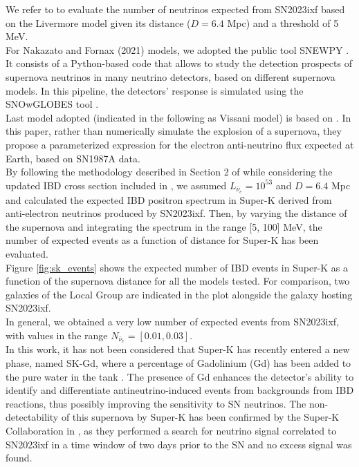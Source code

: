 \documentclass[twocolumn]{aastex631}
\begin{document}
We refer to \cite{art:ikeda} to evaluate the number of neutrinos expected from SN2023ixf based on the Livermore model given its distance ($D=6.4$ Mpc) and a threshold of 5 MeV. \\For Nakazato and Fornax (2021) models,  we adopted the public tool SNEWPY \citep{Baxter2021}. It consists of a Python-based code that allows to study the detection prospects of supernova neutrinos in many neutrino detectors, based on different supernova models. In this pipeline, the detectors' response is simulated using  the SNOwGLOBES tool \citep{snowglobes}.\\
 
Last model adopted (indicated in the following as Vissani model) is based on \cite{art:Vissani2015}. 
In this paper, rather than numerically simulate the explosion of a supernova, they propose a parameterized expression for the electron anti-neutrino flux expected at Earth, based on SN1987A data.\\ 
By following the methodology described in Section 2 of \cite{art:Vissani2015} while considering the updated IBD cross section included in \cite{art:vissani2022}, we assumed $L_{\bar{\nu}_e}=10^{53}$  and $D=6.4$ Mpc and calculated the expected IBD positron spectrum in Super-K derived from anti-electron neutrinos produced by SN2023ixf. Then, by varying the distance of the supernova and integrating the spectrum in the range [5, 100] MeV, the number of expected events as a function of distance for Super-K has been evaluated. \\ 
Figure \ref{fig:sk_events} shows the expected number of IBD events in Super-K as a function of the supernova distance for all the models tested. For comparison, two galaxies of the Local Group are indicated in the plot alongside the galaxy hosting SN2023ixf.\\
In general, we obtained a very low number of expected events from SN2023ixf, with values in the range $N_{\bar{\nu}_e}=[0.01, 0.03]$. \\
In this work, it has not been considered that Super-K has recently entered a new phase, named SK-Gd, where a percentage of Gadolinium (Gd) has been added to the pure water in the tank \citep{art:sk-gd}. The presence of Gd enhances the detector’s ability to identify and differentiate antineutrino-induced events from backgrounds from IBD reactions, thus possibly improving the sensitivity to SN neutrinos.
\smallskip
The non-detectability of this supernova by Super-K has been confirmed by the Super-K Collaboration in \cite{atel_sk}, as they performed a search for neutrino signal correlated to SN2023ixf in a time window of two days prior to the SN and no excess signal was found. 
\end{document}
